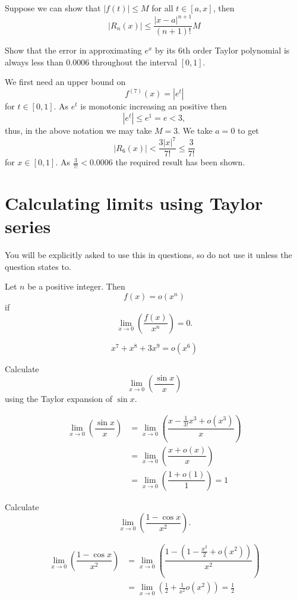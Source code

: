 Suppose we can show that $|f(t)|\leq M$ for all $t\in[a,x]$, then \[|R_n(x)|\leq\dfrac{|x-a|^{n+1}}{(n+1)!}M\]

\begin{example}
    Show that the error in approximating $e^x$ by its 6th order Taylor polynomial is always less than $0.0006$ throughout the interval $[0,1]$.
    
    We first need an upper bound on \[f^{(7)}(x)=|e^t|\] for $t\in[0,1]$. As $e^t$ is monotonic increasing an positive then \[|e^t|\leq e^1=e<3,\] thus, in the above notation we may take $M=3$. We take $a=0$ to get \[|R_6(x)|<\dfrac{3|x|^7}{7!}\leq\dfrac3{7!}\] for $x\in[0,1]$. As $\frac3{7!}<0.0006$ the required result has been shown.
\end{example}

\section{Calculating limits using Taylor series}

\begin{remark}
    You will be explicitly asked to use this in questions, so do not use it unless the question states to.
\end{remark}

\begin{definition}
    Let $n$ be a positive integer. Then \[f(x)=o(x^n)\] if \[\lim_{x\to0}\left(\dfrac{f(x)}{x^n}\right)=0.\]
\end{definition}

\begin{example}
    \[x^7+x^8+3x^9=o(x^6)\]
\end{example}

\begin{example}
    Calculate \[\lim_{x\to0}\left(\dfrac{\sin{x}}x\right)\] using the Taylor expansion of $\sin{x}$.
    
    \begin{align*}
        \lim_{x\to0}\left(\dfrac{\sin{x}}x\right)&=\lim_{x\to0}\left(\dfrac{x-\frac1{3!}x^3+o(x^3)}x\right)\\
        &=\lim_{x\to0}\left(\dfrac{x+o(x)}x\right)\\
        &=\lim_{x\to0}\left(\dfrac{1+o(1)}1\right)=1
    \end{align*}
\end{example}

\begin{example}
    Calculate \[\lim_{x\to0}\left(\dfrac{1-\cos{x}}{x^2}\right).\]
    
    \begin{align*}
        \lim_{x\to0}\left(\dfrac{1-\cos{x}}{x^2}\right)&=\lim_{x\to0}\left(\dfrac{1-(1-\frac{x^2}2+o(x^2))}{x^2}\right)\\
        &=\lim_{x\to0}\left(\frac12+\frac1{x^2}o(x^2)\right)=\frac12\\
    \end{align*}
\end{example}

